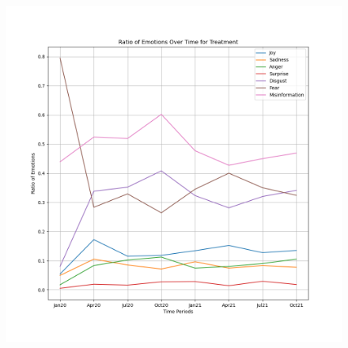 \documentclass{l4proj}
\begin{document}
\begin{appendices}
\begin{figure}[H]
\begin{minipage}[c]{0.49\linewidth}
\includegraphics[width=\textwidth]{images/TreatmentEmotion.png}
\label{fig:treatemo}
\end{minipage}
\end{figure}


\end{appendices}
\end{document}
